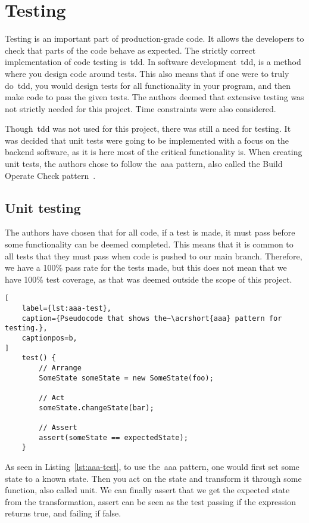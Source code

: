 \section{Testing}\label{sec:testing}
Testing is an important part of production-grade code.
It allows the developers to check that parts of the code behave as expected.
The strictly correct implementation of code testing is~\acrfull{tdd}.
In software development~\acrshort{tdd}, is a method where you design code around tests.
This also means that if one were to truly do~\acrshort{tdd}, you would design tests for all functionality
in your program, and then make code to pass the given tests.
The authors deemed that extensive testing was not strictly needed for this project.
Time constraints were also considered.

Though~\acrshort{tdd} was not used for this project, there was still a need for testing.
It was decided that unit tests were going to be implemented with a focus on the backend software, as
it is here most of the critical functionality is.
When creating unit tests, the authors chose to follow the~\acrfull{aaa} pattern, also called the Build Operate
Check pattern~\cite{clean-code}.

\subsection{Unit testing}\label{subsec:unit-tests}

The authors have chosen that for all code, if a test is made, it must pass before some functionality can be
deemed completed.
This means that it is common to all tests that they must pass when code is pushed to our main branch.
Therefore, we have a 100\% pass rate for the tests made, but this does not mean that we
have 100\% test coverage, as that was deemed outside the scope of this project.

\begin{lstlisting}[
    label={lst:aaa-test},
    caption={Pseudocode that shows the~\acrshort{aaa} pattern for testing.},
    captionpos=b,
]
    test() {
        // Arrange
        SomeState someState = new SomeState(foo);

        // Act
        someState.changeState(bar);

        // Assert
        assert(someState == expectedState);
    }
\end{lstlisting}

As seen in Listing~\ref{lst:aaa-test}, to use the~\acrshort{aaa} pattern,
one would first set some state to a known state.
Then you act on the state and transform it through some function, also called unit.
We can finally assert that we get the expected state from the transformation, assert can be seen
as the test passing if the expression returns true, and failing if false.


